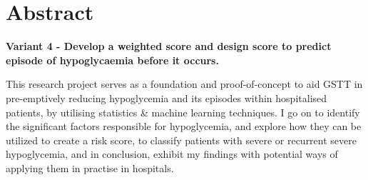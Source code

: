 
\section*{Abstract}

    \begin{flushleft}
    
    \textbf{Variant 4 - Develop a weighted score and design score to predict episode of hypoglycaemia before it occurs.} \\ 

    \vspace{10pt}
    
    \par This research project serves as a foundation and proof-of-concept to aid GSTT in pre-emptively reducing hypoglycemia and its episodes within hospitalised patients, by utilising statistics \& machine learning techniques. I go on to identify the significant factors responsible for hypoglycemia, and explore how they can be utilized to create a risk score, to classify patients with severe or recurrent severe hypoglycemia, and in conclusion, exhibit my findings with potential ways of applying them in practise in hospitals.
    
    
    \end{flushleft}
    
